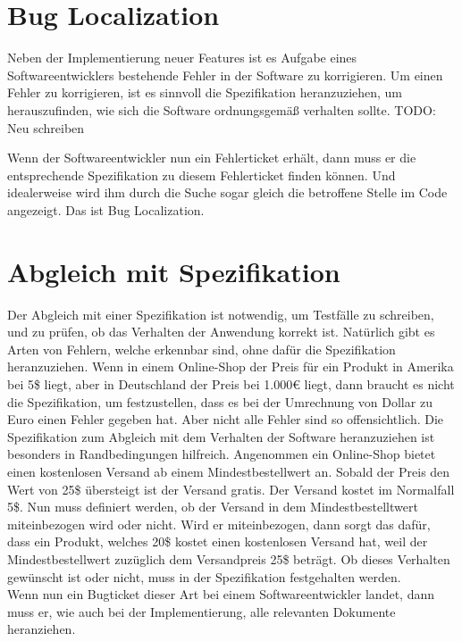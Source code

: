 \section{Bug Localization}
Neben der Implementierung neuer Features ist es Aufgabe eines Softwareentwicklers bestehende Fehler in der Software zu korrigieren.
Um einen Fehler zu korrigieren, ist es sinnvoll die Spezifikation heranzuziehen, um herauszufinden, wie sich die Software ordnungsgemäß verhalten sollte.
TODO: Neu schreiben

Wenn der Softwareentwickler nun ein Fehlerticket erhält, dann muss er die entsprechende Spezifikation zu diesem Fehlerticket finden können.
Und idealerweise wird ihm durch die Suche sogar gleich die betroffene Stelle im Code angezeigt.
Das ist Bug Localization.

\section{Abgleich mit Spezifikation}
Der Abgleich mit einer Spezifikation ist notwendig, um Testfälle zu schreiben, und zu prüfen, ob das Verhalten der Anwendung korrekt ist.
Natürlich gibt es Arten von Fehlern, welche erkennbar sind, ohne dafür die Spezifikation heranzuziehen.
Wenn in einem Online-Shop der Preis für ein Produkt in Amerika bei 5\$ liegt, aber in Deutschland der Preis bei 1.000€ liegt, dann braucht es nicht die Spezifikation, um festzustellen, dass es bei der Umrechnung von Dollar zu Euro einen Fehler gegeben hat.
Aber nicht alle Fehler sind so offensichtlich.
Die Spezifikation zum Abgleich mit dem Verhalten der Software heranzuziehen ist besonders in Randbedingungen hilfreich.
Angenommen ein Online-Shop bietet einen kostenlosen Versand ab einem Mindestbestellwert an.
Sobald der Preis den Wert von 25\$ übersteigt ist der Versand gratis.
Der Versand kostet im Normalfall 5\$.
Nun muss definiert werden, ob der Versand in dem Mindestbestelltwert miteinbezogen wird oder nicht.
Wird er miteinbezogen, dann sorgt das dafür, dass ein Produkt, welches 20\$ kostet einen kostenlosen Versand hat, weil der Mindestbestellwert zuzüglich dem Versandpreis 25\$ beträgt.
Ob dieses Verhalten gewünscht ist oder nicht, muss in der Spezifikation festgehalten werden.\\

Wenn nun ein Bugticket dieser Art bei einem Softwareentwickler landet, dann muss er, wie auch bei der Implementierung, alle relevanten Dokumente heranziehen.

